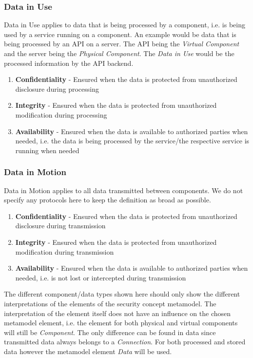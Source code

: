\subsubsection*{Data in Use}

Data in Use applies to data that is being processed by a component, i.e. is being used by a service running on a component. An example would be data that is being processed by an API on a server. The API being the \textit{Virtual Component} and the server being the \textit{Physical Component}. The \textit{Data in Use} would be the processed information by the API backend.

\begin{enumerate}
\item \textbf{Confidentiality} - Ensured when the data is protected from unauthorized disclosure during processing
\item \textbf{Integrity} - Ensured when the data is protected from unauthorized modification during processing
\item \textbf{Availability} - Ensured when the data is available to authorized parties when needed, i.e. the data is being processed by the service/the respective service is running when needed
\end{enumerate}

\subsubsection*{Data in Motion}

Data in Motion applies to all data transmitted between components. We do not specify any protocols here to keep the definition as broad as possible.

\begin{enumerate}
\item \textbf{Confidentiality} - Ensured when the data is protected from unauthorized disclosure during transmission
\item \textbf{Integrity} - Ensured when the data is protected from unauthorized modification during transmission
\item \textbf{Availability} - Ensured when the data is available to authorized parties when needed, i.e. is not lost or intercepted during transmission 
\end{enumerate}

The different component/data types shown here should only show the different interpretations of the elements of the security concept metamodel. The interpretation of the element itself does not have an influence on the chosen metamodel element, i.e. the element for both physical and virtual components will still be \textit{Component}. The only difference can be found in data since transmitted data always belongs to a \textit{Connection}. For both processed and stored data however the metamodel element \textit{Data} will be used.

